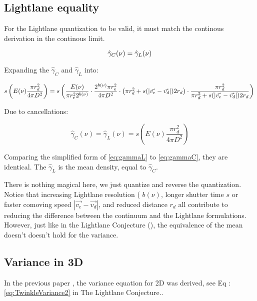 \documentclass[notitlepage]{article}
\begin{document}
\subsection{Lightlane equality}
For the Lightlane quantization to be valid, it must match the continous derivation in the continous limit. 

\begin{equation}
 \hat{\gamma}_C(\nu)  = \hat{\gamma}_L(\nu) \\
 \label{eq:LightlaneEquality}
\end{equation}

Expanding the $\hat{\gamma}_C$ and $\hat{\gamma}_L$ into:

\begin{equation}
 s\left( E(\nu) \frac{\pi r_d^2}{4\pi D^2}\right)  = 
 s\left( 
 	\frac{E(\nu)}{\pi r_e^2 2^{b(\nu)}}  
 	\cdot   \frac{2^{b(\nu)} \pi r_e^2 } {4 \pi D^2} 
 	\cdot \left(  \pi r_d^2+ s (| \vec{v_e}-\vec{v_d} |)  2r_d \right)
	\cdot \frac{\pi r_d^2}{\pi r_d^2 + s (| \vec{v_e}-\vec{v_d} |)   2r_d }	\right) \\
\end{equation}

Due to cancellations:

\begin{equation}
\hat{\gamma}_C(\nu)  = \hat{\gamma}_L(\nu) = s\left( E(\nu) \frac{\pi r_d^2}{4\pi D^2}\right)
\label{eq:gammaL} 
\end{equation}

Comparing the simplified form of \eqref{eq:gammaL} to \eqref{eq:gammaC}, they are identical. The $\hat{\gamma}_L$ is the mean density, equal to $\hat{\gamma}_C$. 

There is nothing magical here, we just quantize and reverse the quantization. Notice that increasing Lightlane resolution ( $b(\nu)$, longer shutter time $s$ or faster comoving speed $|\vec{v_e} - \vec{v_d}|$, and reduced distance $r_d$ all contribute to reducing the difference between the continuum and the Lightlane formulations.  However, just like in the Lightlane Conjecture (\citep{RhadamantysA2}), the equivalence of the mean doesn't doesn't hold for the variance. 

\subsection{Variance in 3D}
In the previous paper , the variance equation for 2D was derived, see Eq : \ref{eq:TwinkleVariance2} in The Lightlane Conjecture.\cite{RhadamantysA2}.
\end{document}
